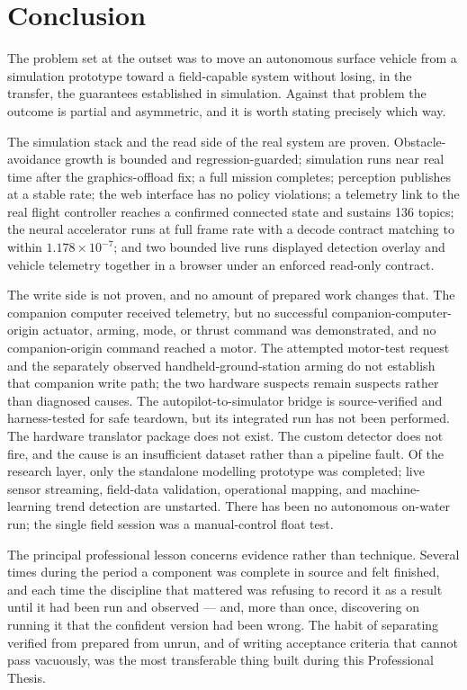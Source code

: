 \documentclass[a4paper,12pt,oneside,openany]{report}
\begin{document}
\chapter*{Conclusion}

The problem set at the outset was to move an autonomous surface vehicle from a simulation prototype
toward a field-capable system without losing, in the transfer, the guarantees established in
simulation. Against that problem the outcome is partial and asymmetric, and it is worth stating
precisely which way.

The simulation stack and the read side of the real system are proven. Obstacle-avoidance growth is
bounded and regression-guarded; simulation runs near real time after the graphics-offload fix; a
full mission completes; perception publishes at a stable rate; the web interface has no policy
violations; a telemetry link to the real flight controller reaches a confirmed connected state and
sustains 136 topics; the neural accelerator runs at full frame rate with a decode contract matching
to within $1.178\times10^{-7}$; and two bounded live runs displayed detection overlay and vehicle
telemetry together in a browser under an enforced read-only contract.

The write side is not proven, and no amount of prepared work changes that. The companion computer
received telemetry, but no successful companion-computer-origin actuator, arming, mode, or thrust
command was demonstrated, and no companion-origin command reached a motor. The attempted motor-test
request and the separately observed handheld-ground-station arming do not establish that companion
write path; the two hardware suspects remain suspects rather than diagnosed causes. The
autopilot-to-simulator bridge is source-verified and harness-tested for safe teardown,
but its integrated run has not been performed. The hardware translator package does not exist. The
custom detector does not fire, and the cause is an insufficient dataset rather than a pipeline
fault. Of the research layer, only the standalone modelling
prototype was completed; live sensor streaming, field-data validation, operational mapping, and
machine-learning trend detection are unstarted. There has been no autonomous on-water run; the single field session was a
manual-control float test.

The principal professional lesson concerns evidence rather than technique. Several times during the
period a component was complete in source and felt finished, and each time the discipline that
mattered was refusing to record it as a result until it had been run and observed --- and, more
than once, discovering on running it that the confident version had been wrong. The habit of
separating verified from prepared from unrun, and of writing acceptance criteria that cannot pass
vacuously, was the most transferable thing built during this Professional Thesis.
\end{document}
